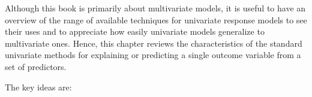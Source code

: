 \documentclass[
  letterpaper,
  10pt,
  krantz2]{krantz}
\begin{document}
\renewcommand*{\vec}[1]{\mathbf{#1}}
\newcommand{\trans}{^\mathsf{T}}
\newcommand*{\mat}[1]{\mathbf{#1}}
\newcommand*{\diag}[1]{\mathrm{diag}\, #1}

\renewcommand*{\det}[1]{\mathrm{det}(#1)}
\newcommand*{\rank}[1]{\mathrm{rank} (\mathbf{#1})}
\newcommand*{\trace}[1]{\mathrm{tr} (\mathbf{#1})}
\newcommand*{\dev}[1]{(#1 - \bar{#1})}
\newcommand*{\inv}[1]{\mat{#1}^{-1}}
\newcommand*{\half}[1]{\mat{#1}^{1/2}}
\newcommand*{\invhalf}[1]{\mat{#1}^{-1/2}}
\newcommand*{\nvec}[2]{{#1}_{1}, {#1}_{2},\ldots,{#1}_{#2}}
\newcommand*{\Beta}{\boldsymbol{B}}
\newcommand*{\Epsilon}{\boldsymbol{\Large\varepsilon}}
\newcommand*{\period}{\:\: .}
\newcommand*{\comma}{\:\: ,}
\newcommand*{\given}{\, | \,}
\newcommand*{\Real}[1]{\mathbb{R}^{#1}}
\newcommand*{\degree}[1]{{#1}^{\circ}}

\newcommand{\sizedmat}[2]{\mathord{\mathop{\mat{#1}}\limits_{#2}}}

\renewcommand*{\H}{\mathbf{H}}               
\newcommand*{\E}{\mathbf{E}}
\newcommand*{\widebar}[1]{\overline{#1}}

\newcommand{\Var}{\mathsf{Var}}
\newcommand{\Cov}{\mathsf{Cov}}
\newcommand{\HO}{\mathcal{H}_0}

\newcommand*{\V}{\mathcal{V}}

\newcommand{\pkg}[1]{\textsf{#1}}
\newcommand{\Rpackage}[1]{\pkg{#1} package}

Although this book is primarily about multivariate models, it is useful
to have an overview of the range of available techniques for univariate
response models to see their uses and to appreciate how easily
univariate models generalize to multivariate ones. Hence, this chapter
reviews the characteristics of the standard univariate methods for
explaining or predicting a single outcome variable from a set of
predictors.

The key ideas are:
\end{document}
